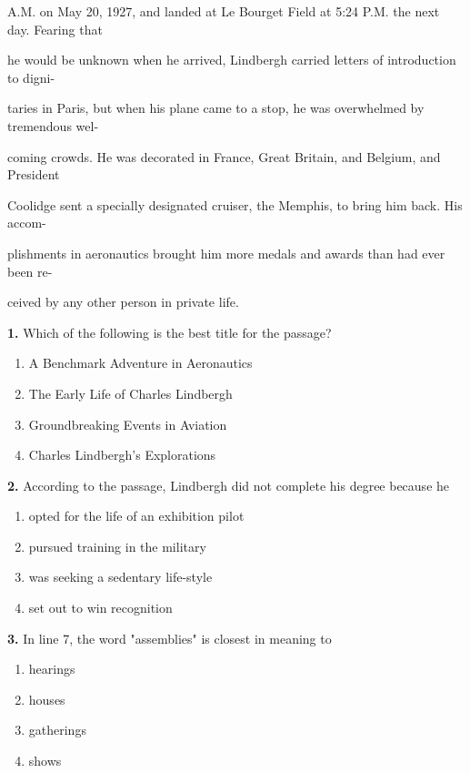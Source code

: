 \documentclass[12pt]{article}
\begin{document}
A.M. on May 20, 1927, and landed at Le Bourget Field at 5:24 P.M. the next day. Fearing that\par
he would be unknown when he arrived, Lindbergh carried letters of introduction to digni-\par
taries in Paris, but when his plane came to a stop, he was overwhelmed by tremendous wel-\par
coming crowds. He was decorated in France, Great Britain, and Belgium, and President\par
Coolidge sent a specially designated cruiser, the Memphis, to bring him back. His accom-\par
plishments in aeronautics brought him more medals and awards than had ever been re-\par
ceived by any other person in private life.\par
\endgroup
\medskip
\noindent\textbf{1.} Which of the following is the best title for the passage?
\begin{enumerate}[label=(\Alph*),leftmargin=*,itemsep=0.2em]
\item A Benchmark Adventure in Aeronautics
\item The Early Life of Charles Lindbergh
\item Groundbreaking Events in Aviation
\item Charles Lindbergh's Explorations
\end{enumerate}
\par
\vspace{0.25\baselineskip}
\noindent\textbf{2.} According to the passage, Lindbergh did not complete his degree because he
\begin{enumerate}[label=(\Alph*),leftmargin=*,itemsep=0.2em]
\item opted for the life of an exhibition pilot
\item pursued training in the military
\item was seeking a sedentary life-style
\item set out to win recognition
\end{enumerate}
\par
\vspace{0.25\baselineskip}
\noindent\textbf{3.} In line 7, the word "assemblies" is closest in meaning to
\begin{enumerate}[label=(\Alph*),leftmargin=*,itemsep=0.2em]
\item hearings
\item houses
\item gatherings
\item shows
\end{enumerate}
\end{document}

